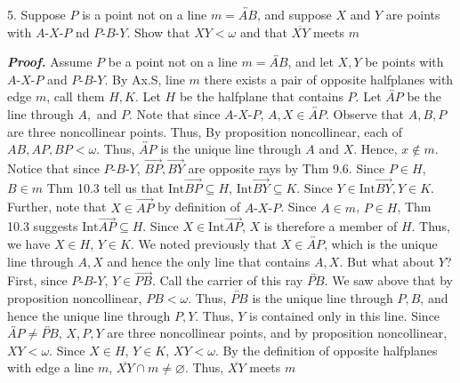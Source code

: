 \documentclass{report}
\begin{document}
    \bigbreak \noindent 
    \begin{mdframed}
        5. Suppose $P$ is a point not on a line $m = \overleftrightarrow{AB}$, and suppose $X$ and $Y$ are points with $ A\text{-}X\text{-}P$ nd $ P\text{-}B\text{-}Y $. Show that $XY < \omega$ and that $\overline{XY} $ meets $m$
    \end{mdframed}
    \bigbreak \noindent 
    \textbf{\textit{Proof.}} Assume $P$ be a point not on a line $m = \overleftrightarrow{AB}$, and let $X,Y$ be points with $ A\text{-}X\text{-}P$ and $ P\text{-}B\text{-}Y$. 
    \bigbreak \noindent 
    By Ax.S, line $m$ there exists a pair of opposite halfplanes with edge $m$, call them $H,K$. Let $H$ be the halfplane that contains $P$. Let $\overleftrightarrow{AP}$ be the line through $A,$ and $P$. Note that since $ A\text{-}X\text{-}P$, $A,X \in \overleftrightarrow{AP}$. Observe that $A,B,P$ are three noncollinear points. Thus, By proposition noncollinear, each of $AB,AP,BP < \omega$. Thus, $\overleftrightarrow{AP}$ is the unique line through $A$ and $X$. Hence, $x \not\in m$. 
    \bigbreak \noindent 
    Notice that since $ P\text{-}B\text{-}Y$, $\overrightarrow{BP}, \overrightarrow{BY}$ are opposite rays by Thm 9.6. Since $P \in H$, $B \in m$ Thm 10.3 tell us that $\text{Int}\overrightarrow{BP} \subseteq H$, $\text{Int}\overrightarrow{BY} \subseteq K$. Since $Y \in \text{Int}\overrightarrow{BY}, Y \in K$.
    \bigbreak \noindent 
    Further, note that $X \in \overrightarrow{AP}$ by definition of $ A\text{-}X\text{-}P $. Since $A \in m$, $P\in H$, Thm 10.3 suggests $\text{Int}\overrightarrow{AP} \subseteq H$. Since $X \in \text{Int}\overrightarrow{AP}$, $X$ is therefore a member of $H$. 
    \bigbreak \noindent 
    Thus, we have $X \in H$, $Y \in K$. We noted previously that $X \in \overleftrightarrow{AP}$, which is the unique line through $A,X$ and hence the only line that contains $A,X$. But what about $Y$?
    \bigbreak \noindent 
    First, since $ P\text{-}B\text{-}Y$, $Y \in \overrightarrow{PB}$. Call the carrier of this ray $\overleftrightarrow{PB}$. We saw above that by proposition noncollinear, $PB < \omega$. Thus, $\overleftrightarrow{PB}$ is the unique line through $P,B$, and hence the unique line through $P,Y$. Thus, $Y$ is contained only in this line.
    Since $ \overleftrightarrow{AP} \ne \overleftrightarrow{PB}$, $X,P,Y$ are three noncollinear points, and by proposition noncollinear, $XY < \omega$. 
    \bigbreak \noindent 
    Since $X \in H$, $Y \in K$, $XY < \omega$. By the definition of opposite halfplanes with edge a line $m$, $\overline{XY} \cap m \ne \varnothing$. Thus, $\overline{XY}$ meets $m$ \endpf
\end{document}

